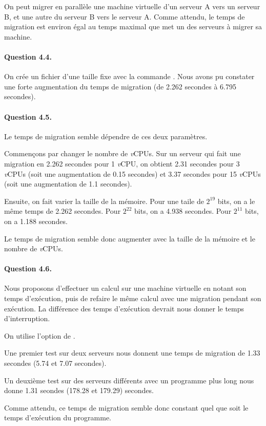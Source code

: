\documentclass[12pt]{article}
\begin{document}
On peut migrer en parallèle une machine virtuelle d'un serveur A vers un serveur B, et une autre du serveur B vers le serveur A. Comme attendu, le temps de migration est environ égal au temps maximal que met un des serveurs à migrer sa machine. 

\paragraph{Question 4.4.}

On crée un fichier d'une taille fixe avec la commande . Nous avons pu constater une forte augmentation du temps de migration (de 2.262 secondes à 6.795 secondes). 


\paragraph{Question 4.5.}

\def\vcpu{\textit{v}CPU}

Le temps de migration semble dépendre de ces deux paramètres.

Commençons par changer le nombre de \vcpu s. Sur un serveur qui fait une migration en 2.262 secondes pour 1 \vcpu, on obtient 2.31 secondes pour 3 \vcpu s (soit une augmentation de 0.15 secondes) et 3.37 secondes pour 15 \vcpu s (soit une augmentation de 1.1 secondes).

Ensuite, on fait varier la taille de la mémoire.
Pour une taile de $2^{19}$ bits, on a le même temps de 2.262 secondes.
Pour $2^{22}$ bits, on a 4.938 secondes.
Pour $2^{11}$ bits, on a 1.188 secondes.

Le temps de migration semble donc augmenter avec la taille de la mémoire et le nombre de \vcpu s.


\paragraph{Question 4.6.}

Nous proposons d'effectuer un calcul sur une machine virtuelle en notant son temps d'exécution, puis de refaire le même calcul avec une migration pendant son exécution. La différence des temps d'exécution devrait nous donner le temps d'interruption.

On utilise l'option  de .

Une premier test sur deux serveurs nous donnent une temps de migration de 1.33 secondes (5.74 et 7.07 secondes).

Un deuxième test sur des serveurs différents avec un programme plus long nous donne 1.31 seondes (178.28 et 179.29) secondes.

Comme attendu, ce temps de migration semble donc constant quel que soit le temps d'exécution du programme.
\end{document}
